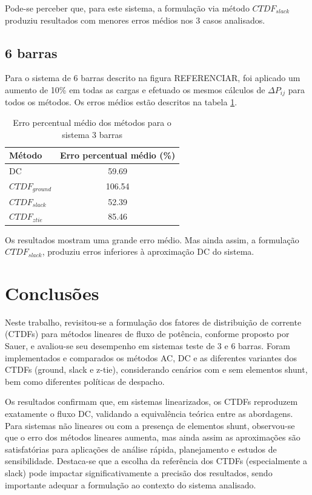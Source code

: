 \documentclass[journal]{IEEEtran}
\begin{document}
Pode-se perceber que, para este sistema, a formulação via método $CTDF_{slack}$ produziu resultados com menores erros médios nos 3 casos analisados.


\subsection{6 barras}
Para o sistema de 6 barras descrito na figura REFERENCIAR, foi aplicado um aumento de 10\% em todas as cargas e efetuado os mesmos cálculos de $\Delta P_{ij}$ para todos os métodos. Os erros médios estão descritos na tabela \ref{tab:erro_6bus}.

\begin{table}[!ht]
\centering
\caption{Erro percentual médio dos métodos para o sistema 3 barras}
\label{tab:erro_6bus}
\begin{tabular}{l|c}
\hline
Método            & Erro percentual médio (\%) \\
\hline
DC                & 59.69 \\
$CTDF_{ground}$   & 106.54 \\
$CTDF_{slack}$    & 52.39 \\
$CTDF_{ztie}$     & 85.46 \\
\hline
\end{tabular}
\end{table}

Os resultados mostram uma grande erro médio. Mas ainda assim, a formulação $CTDF_{slack}$, produziu erros inferiores à aproximação DC do sistema.




\section{Conclusões}
Neste trabalho, revisitou-se a formulação dos fatores de distribuição de corrente (CTDFs) para métodos lineares de fluxo de potência, conforme proposto por Sauer, e avaliou-se seu desempenho em sistemas teste de 3 e 6 barras. Foram implementados e comparados os métodos AC, DC e as diferentes variantes dos CTDFs (ground, slack e z-tie), considerando cenários com e sem elementos shunt, bem como diferentes políticas de despacho.

Os resultados confirmam que, em sistemas linearizados, os CTDFs reproduzem exatamente o fluxo DC, validando a equivalência teórica entre as abordagens. Para sistemas não lineares ou com a presença de elementos shunt, observou-se que o erro dos métodos lineares aumenta, mas ainda assim as aproximações são satisfatórias para aplicações de análise rápida, planejamento e estudos de sensibilidade. Destaca-se que a escolha da referência dos CTDFs (especialmente a slack) pode impactar significativamente a precisão dos resultados, sendo importante adequar a formulação ao contexto do sistema analisado.
\end{document}
